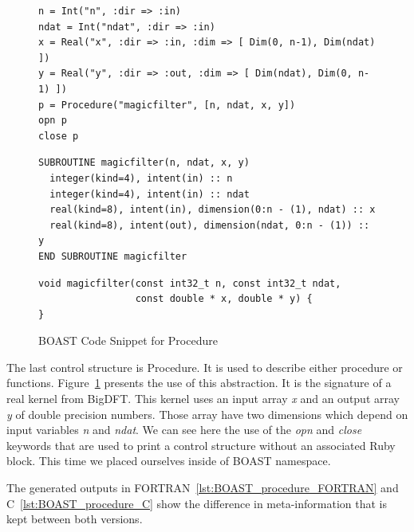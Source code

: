 \documentclass[11pt, a4paper, twoside]{montblanc}
\begin{document}
\begin{figure}
\begin{lstlisting}
n = Int("n", :dir => :in)
ndat = Int("ndat", :dir => :in)
x = Real("x", :dir => :in, :dim => [ Dim(0, n-1), Dim(ndat) ])
y = Real("y", :dir => :out, :dim => [ Dim(ndat), Dim(0, n-1) ])
p = Procedure("magicfilter", [n, ndat, x, y])
opn p
close p
\end{lstlisting}


\begin{lstlisting}
SUBROUTINE magicfilter(n, ndat, x, y)
  integer(kind=4), intent(in) :: n
  integer(kind=4), intent(in) :: ndat
  real(kind=8), intent(in), dimension(0:n - (1), ndat) :: x
  real(kind=8), intent(out), dimension(ndat, 0:n - (1)) :: y
END SUBROUTINE magicfilter
\end{lstlisting}

\begin{lstlisting}
void magicfilter(const int32_t n, const int32_t ndat,
                 const double * x, double * y) {
}
\end{lstlisting}
\caption{BOAST Code Snippet for Procedure}
\label{fig:BOAST_procedure}
\end{figure}

The last control structure is Procedure. It is used to describe either procedure
or functions. Figure~\ref{fig:BOAST_procedure} presents the use of this
abstraction. It is the signature of a real kernel from BigDFT. This kernel uses
an input array \emph{x} and an output array \emph{y} of double precision
numbers. Those array have two dimensions which depend on input variables
\emph{n} and \emph{ndat}. We can see here the use of the \emph{opn} and
\emph{close} keywords that are used to print a control structure without an
associated Ruby block. This time we placed ourselves inside of BOAST namespace.

The generated outputs in FORTRAN~\ref{lst:BOAST_procedure_FORTRAN} and
C~\ref{lst:BOAST_procedure_C} show the difference in meta-information that is
kept between both versions.
  
\end{document}
